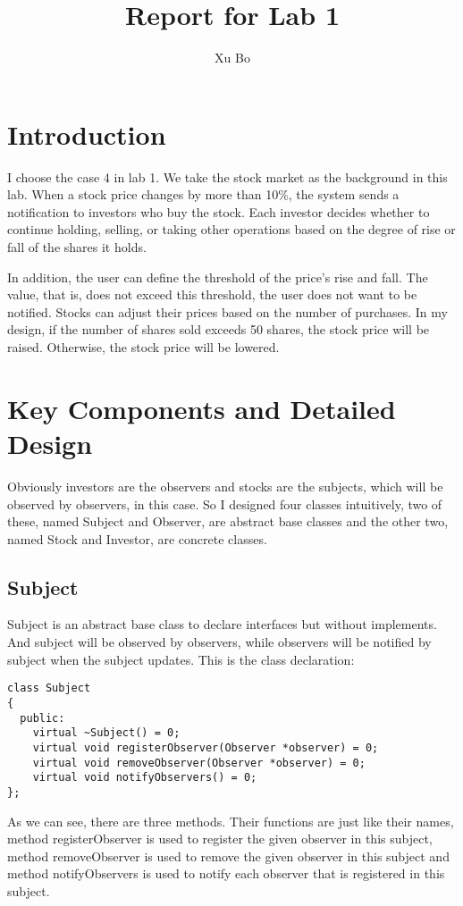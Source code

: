 \documentclass{article}
\title{Report for Lab 1}
\author{Xu Bo}
\date{}
\begin{document}
	\maketitle
	
\section{Introduction}
    I choose the case 4 in lab 1. We take the stock market as the background in this lab. When a stock price changes by more than 10\%, the system sends a notification to investors who buy the stock. Each investor decides whether to continue holding, selling, or taking other operations based on the degree of rise or fall of the shares it holds. 
    
    In addition, the user can define the threshold of the price's rise and fall. The value, that is, does not exceed this threshold, the user does not want to be notified. Stocks can adjust their prices based on the number of purchases. In my design, if the number of shares sold exceeds 50 shares, the stock price will be raised. Otherwise, the stock price will be lowered.

\section{Key Components and Detailed Design}
    Obviously investors are the observers and stocks are the subjects, which will be observed by observers, in this case. So I designed four classes intuitively, two of these, named Subject and Observer, are abstract base classes and the other two, named Stock and Investor, are concrete classes.
    
\subsection{Subject}
    Subject is an abstract base class to declare interfaces but without implements. And subject will be observed by observers, while observers will be notified by subject when the subject updates. This is the class declaration:
    
\begin{lstlisting}
class Subject
{
  public:
    virtual ~Subject() = 0;
    virtual void registerObserver(Observer *observer) = 0;
    virtual void removeObserver(Observer *observer) = 0;
    virtual void notifyObservers() = 0;
};
\end{lstlisting}

    As we can see, there are three methods. Their functions are just like their names, method registerObserver is used to register the given observer in this subject, method removeObserver is used to remove the given observer in this subject and method notifyObservers is used to notify each observer that is registered in this subject.
    
\end{document}
